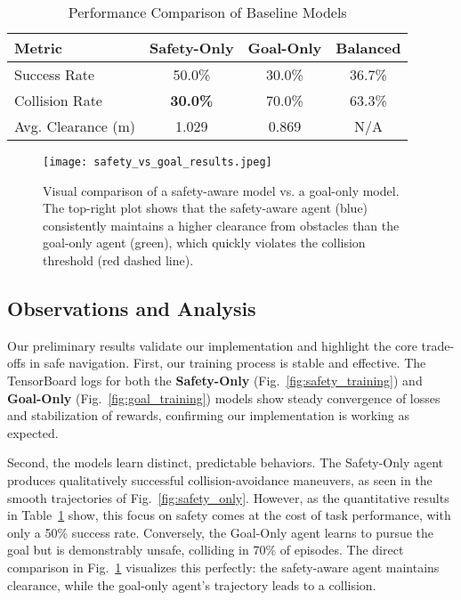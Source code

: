 \documentclass[10pt,conference]{IEEEtran}
\begin{document}
\begin{table}[h!]
\caption{Performance Comparison of Baseline Models}
\label{tab:baseline_comparison}
\centering
\begin{tabular}{@{}lccc@{}}
\toprule
Metric & Safety-Only & Goal-Only & Balanced \\ \midrule
Success Rate & 50.0\% & 30.0\% & 36.7\% \\
Collision Rate & \textbf{30.0\%} & 70.0\% & 63.3\% \\
Avg. Clearance (m) & 1.029 & 0.869 & N/A \\ \bottomrule
\end{tabular}
\end{table}

\begin{figure}[h!]
    \centering
    \texttt{[image: safety\_vs\_goal\_results.jpeg]}
    \caption{Visual comparison of a safety-aware model vs. a goal-only model. The top-right plot shows that the safety-aware agent (blue) consistently maintains a higher clearance from obstacles than the goal-only agent (green), which quickly violates the collision threshold (red dashed line).}
    \label{fig:visual_comparison}
\end{figure}

\subsection{Observations and Analysis}
Our preliminary results validate our implementation and highlight the core trade-offs in safe navigation.
First, our training process is stable and effective. The TensorBoard logs for both the \textbf{Safety-Only} (Fig.~\ref{fig:safety_training}) and \textbf{Goal-Only} (Fig.~\ref{fig:goal_training}) models show steady convergence of losses and stabilization of rewards, confirming our implementation is working as expected.

Second, the models learn distinct, predictable behaviors. The Safety-Only agent produces qualitatively successful collision-avoidance maneuvers, as seen in the smooth trajectories of Fig.~\ref{fig:safety_only}. However, as the quantitative results in Table~\ref{tab:baseline_comparison} show, this focus on safety comes at the cost of task performance, with only a 50\% success rate. Conversely, the Goal-Only agent learns to pursue the goal but is demonstrably unsafe, colliding in 70\% of episodes. The direct comparison in Fig.~\ref{fig:visual_comparison} visualizes this perfectly: the safety-aware agent maintains clearance, while the goal-only agent's trajectory leads to a collision.
\end{document}

